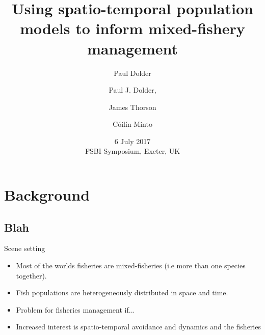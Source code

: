 \documentclass[xcolor=x11names,compress]{beamer}
\renewcommand{\(}{\begin{columns}}
\renewcommand{\)}{\end{columns}}
\newcommand{\<}[1]{\begin{column}{#1}}
\renewcommand{\>}{\end{column}}
\begin{document}
\addtocounter{framenumber}{-1}

\begin{frame}
\title{Using spatio-temporal population models to inform mixed-fishery management}


\author{Paul Dolder}
\author[shortname]{Paul J. Dolder,  \and 
	James Thorson  \and 
	Cóilín Minto}
\vspace{-0.5cm}


\date{6 July 2017 \\ FSBI Symposium, Exeter, UK}
\titlepage
\end{frame}


\begin{frame}
\tableofcontents
\end{frame}

\section{Background}
\subsection{Blah}
\begin{frame}{Scene setting}

	\begin{itemize}
		\item Most of the worlds fisheries are mixed-fisheries (i.e more
			than one species together).
		\item Fish populations are heterogeneously distributed in space
			and time.
		\item Problem for fisheries management if...
		\item Increased interest is spatio-temporal avoidance and
			dynamics and the fisheries
	\end{itemize}
	
\end{frame}
\end{document}
